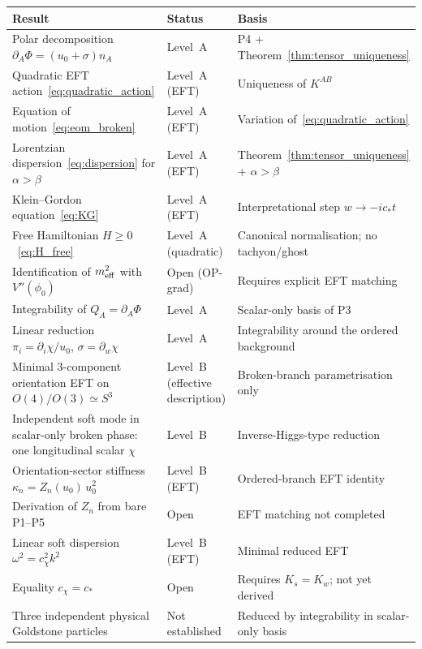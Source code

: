 \documentclass[11pt,a4paper]{article}
\numberwithin{equation}{section}
\begin{document}
\begin{center}
\renewcommand{\arraystretch}{1.4}
\begin{tabular}{p{5.5cm}p{3.5cm}p{4.0cm}}
\hline\hline
Result & Status & Basis \\
\hline
Polar decomposition $\partial_A\Phi=(u_0+\sigma)n_A$
  & Level~A & P4 + Theorem~\ref{thm:tensor_uniqueness} \\
Quadratic EFT action~\eqref{eq:quadratic_action}
  & Level~A (EFT) & Uniqueness of $K^{AB}$ \\
Equation of motion~\eqref{eq:eom_broken}
  & Level~A (EFT) & Variation of~\eqref{eq:quadratic_action} \\
Lorentzian dispersion~\eqref{eq:dispersion} for $\alpha>\beta$
  & Level~A (EFT) & Theorem~\ref{thm:tensor_uniqueness} + $\alpha>\beta$ \\
Klein--Gordon equation~\eqref{eq:KG}
  & Level~A (EFT) & Interpretational step $w\to -ic_*t$ \\
Free Hamiltonian $H\geq 0$~\eqref{eq:H_free}
  & Level~A (quadratic) & Canonical normalisation; no tachyon/ghost \\
Identification of $m_{\rm eff}^2$ with $V''(\phi_0)$
  & Open (OP-grad) & Requires explicit EFT matching \\
Integrability of $Q_A=\partial_A\Phi$
  & Level~A & Scalar-only basis of P3 \\
Linear reduction $\pi_i=\partial_i\chi/u_0$, $\sigma=\partial_w\chi$
  & Level~A & Integrability around the ordered background \\
Minimal 3-component orientation EFT on $O(4)/O(3)\simeq S^3$
  & Level~B (effective description) & Broken-branch parametrisation only \\
Independent soft mode in scalar-only broken phase: one longitudinal scalar $\chi$
  & Level~B & Inverse-Higgs-type reduction~\cite{Ivanov1975,McArthur2010} \\
Orientation-sector stiffness $\kappa_n = Z_n(u_0)\,u_0^2$
  & Level~B (EFT) & Ordered-branch EFT identity \\
Derivation of $Z_n$ from bare P1--P5
  & Open & EFT matching not completed \\
Linear soft dispersion $\omega^2=c_\chi^2 k^2$
  & Level~B (EFT) & Minimal reduced EFT \\
Equality $c_\chi=c_*$
  & Open & Requires $K_s=K_w$; not yet derived \\
Three independent physical Goldstone particles
  & Not established & Reduced by integrability in scalar-only basis \\

\end{tabular}
\end{center}
\end{document}
